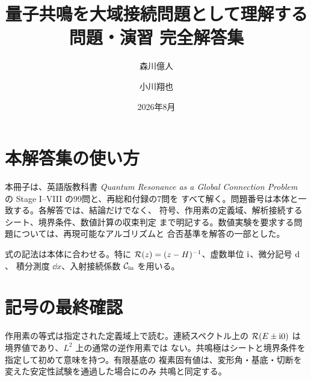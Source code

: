 \documentclass[11pt,openany]{book}
\title{量子共鳴を大域接続問題として理解する\\[0.8ex]
  \Large 問題・演習 完全解答集}
\author{森川億人 \and 小川翔也}
\date{2026年8月}
\begin{document}
\frontmatter
\maketitle
\chapter*{本解答集の使い方}
本冊子は、英語版教科書 \textit{Quantum Resonance as a Global
Connection Problem} の Stage I--VIII の99問と、再総和付録の7問を
すべて解く。問題番号は本体と一致する。各解答では、結論だけでなく、
符号、作用素の定義域、解析接続するシート、境界条件、数値計算の収束判定
まで明記する。数値実験を要求する問題については、再現可能なアルゴリズムと
合否基準を解答の一部とした。

式の記法は本体に合わせる。特に
$\mathcal{R}(z)=(z-H)^{-1}$、虚数単位 $\mathrm{i}$、微分記号 $\mathrm{d}$、
積分測度 $\dd x$、入射接続係数 $\mathcal{C}_{\mathrm{in}}$ を用いる。
\tableofcontents

\mainmatter










\backmatter
\chapter*{記号の最終確認}
作用素の等式は指定された定義域上で読む。連続スペクトル上の
$\mathcal{R}(E\pm\mathrm{i}0)$ は境界値であり、$L^2$ 上の通常の逆作用素では
ない。共鳴極はシートと境界条件を指定して初めて意味を持つ。有限基底の
複素固有値は、変形角・基底・切断を変えた安定性試験を通過した場合にのみ
共鳴と同定する。
\end{document}
